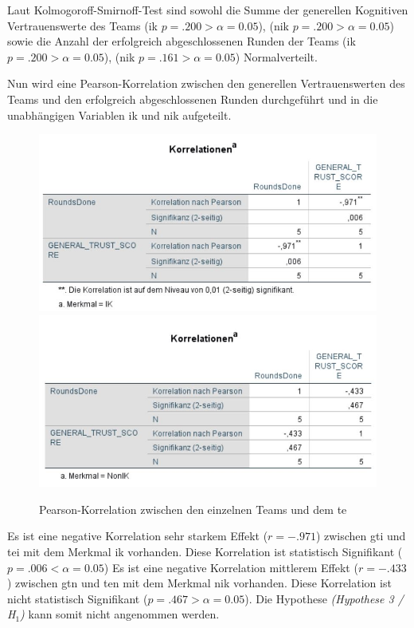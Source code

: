\documentclass[a4paper,11pt]{article}%
\renewcommand{\\}{\vspace*{0.5\baselineskip} \newline}
\begin{document}
Laut Kolmogoroff-Smirnoff-Test sind sowohl die Summe der generellen Kognitiven Vertrauenswerte des Teams (\ac{ik} $p = .200 > \alpha = 0.05$), (\ac{nik} $p = .200 > \alpha = 0.05$) sowie die Anzahl der erfolgreich abgeschlossenen Runden der Teams (\ac{ik} $p = .200 > \alpha = 0.05$), (\ac{nik} $p = .161 > \alpha = 0.05$) Normalverteilt.

Nun wird eine Pearson-Korrelation zwischen den generellen Vertrauenswerten des Teams und den erfolgreich abgeschlossenen Runden durchgeführt und in die unabhängigen Variablen \ac{ik} und \ac{nik} aufgeteilt.

\begin{figure}[H]
\centering
		\begin{footnotesize}
			\includegraphics[scale=0.8]{Abbildungen/Post_QuestionnaireStatistiks/h5_korr_gt_te_ik}
			\includegraphics[scale=0.8]{Abbildungen/Post_QuestionnaireStatistiks/h5_korr_gt_te_nik}
			\caption{Pearson-Korrelation zwischen den einzelnen Teams und dem \ac{te}}
			\label{fig:Pearson_ik_nik_h3}
		\end{footnotesize}
	\end{figure}	

Es ist eine negative Korrelation sehr starkem Effekt ($r = -.971$) zwischen \ac{gti} und \ac{tei} mit dem Merkmal \ac{ik} vorhanden. Diese Korrelation ist statistisch Signifikant ($p = .006 < \alpha = 0.05$)
Es ist eine negative Korrelation mittlerem Effekt ($r = -.433$) zwischen \ac{gtn} und \ac{ten} mit dem Merkmal \ac{nik} vorhanden. Diese Korrelation ist nicht statistisch Signifikant ($p = .467 > \alpha = 0.05$).
Die Hypothese \textit{(Hypothese 3 / H$_{1}$)} kann somit nicht angenommen werden.
\end{document}
